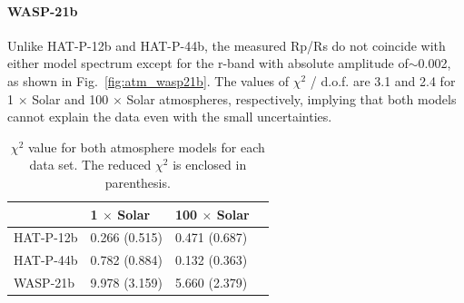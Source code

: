 \paragraph{WASP-21b}
Unlike HAT-P-12b and HAT-P-44b, the measured Rp/Rs do not coincide with either model spectrum except for the r-band with absolute amplitude of$\sim$0.002, as shown in Fig.~\ref{fig:atm_wasp21b}.
The values of $\chi^2$ / d.o.f. are 3.1 and 2.4 %
for 1 $\times$ Solar and 100 $\times$ Solar atmospheres, respectively, implying that both models cannot explain the data even with the small uncertainties. %

\begin{table}
\centering
\caption{$\chi^2$ value for both atmosphere models for each data set. The reduced $\chi^2$ is enclosed in parenthesis.}
\label{tab:chi2}
\begin{tabular}{llll}
& 1 $\times$ Solar & 100 $\times$ Solar \\
\hline
HAT-P-12b & 0.266 (0.515)  & 0.471 (0.687)  \\   
HAT-P-44b & 0.782 (0.884)  & 0.132 (0.363)  \\    
WASP-21b  & 9.978 (3.159)  & 5.660 (2.379)  \\       
\hline
\end{tabular}
\end{table}


